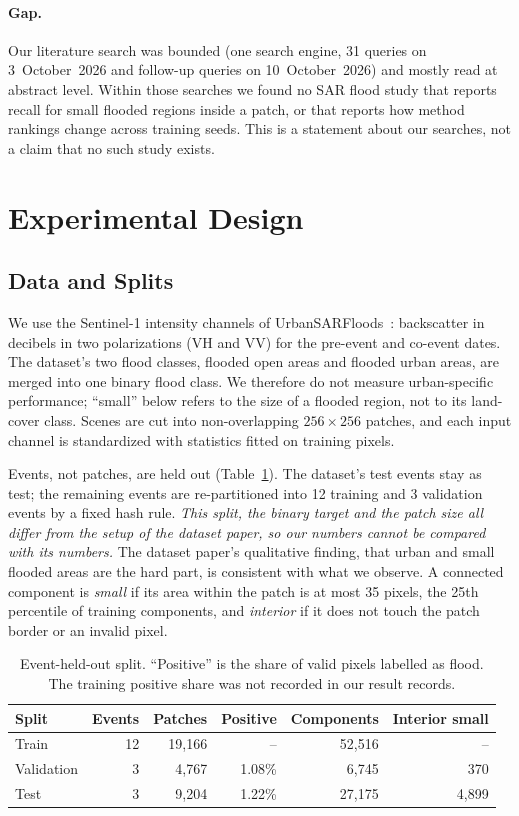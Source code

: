 \documentclass[runningheads]{llncs}
\begin{document}
\paragraph{Gap.} Our literature search was bounded (one search engine, 31 queries on
3~October~2026 and follow-up queries on 10~October~2026) and mostly read at abstract level.
Within those searches we found no SAR flood study that reports recall for small flooded
regions inside a patch, or that reports how method rankings change across training seeds.
This is a statement about our searches, not a claim that no such study exists.

\section{Experimental Design}

\subsection{Data and Splits}

We use the Sentinel-1 intensity channels of UrbanSARFloods~\cite{zhao2024urbansarfloods}:
backscatter in decibels in two polarizations (VH and VV) for the pre-event and co-event
dates. The dataset's two flood classes, flooded open areas and flooded urban areas, are
merged into one binary flood class. We therefore do not measure urban-specific performance;
``small'' below refers to the size of a flooded region, not to its land-cover class. Scenes are cut into non-overlapping
$256\times 256$ patches, and each input channel is standardized with statistics fitted on
training pixels.

Events, not patches, are held out (Table~\ref{tab:data}). The dataset's test events stay as
test; the remaining events are re-partitioned into 12 training and 3 validation events by a
fixed hash rule. \emph{This split, the binary target and the patch size all differ from the
setup of the dataset paper, so our numbers cannot be compared with its numbers.} The dataset
paper's qualitative finding, that urban and small flooded areas are the hard part, is
consistent with what we observe. A connected component is
\emph{small} if its area within the patch is at most 35 pixels, the 25th percentile of
training components, and \emph{interior} if it does not touch the patch border or an invalid
pixel.

\begin{table}[t]
\centering
\caption{Event-held-out split. ``Positive'' is the share of valid pixels labelled as flood.
The training positive share was not recorded in our result records.}
\label{tab:data}
\begin{tabular}{lrrrrr}
\toprule
Split & Events & Patches & Positive & Components & Interior small \\
\midrule
Train & 12 & 19,166 & -- & 52,516 & -- \\
Validation & 3 & 4,767 & 1.08\% & 6,745 & 370 \\
Test & 3 & 9,204 & 1.22\% & 27,175 & 4,899 \\
\bottomrule
\end{tabular}
\end{table}
\end{document}
